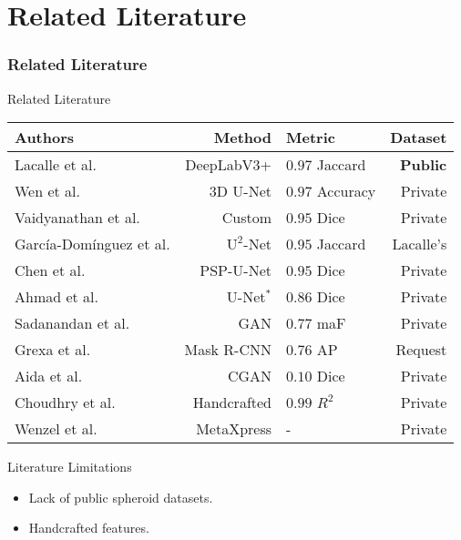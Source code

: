 \section{Related Literature}


\begin{frame}{}
    \frametitle{Related Literature}
\end{frame}


\begin{frame}{Related Literature}
    \begin{table}
        \centering
        \setlength{\tabcolsep}{10pt}

        \begin{tabular}{lrlr}
            \textbf{Authors} & \textbf{Method} & \textbf{Metric} & \textbf{Dataset} \\
            \toprule
            Lacalle et al. & DeepLabV3+ & $0.97$ Jaccard & \textbf{Public} \\
            Wen et al. & 3D U-Net & $0.97$ Accuracy & Private \\
            Vaidyanathan et al. & Custom & $0.95$ Dice & Private \\
            García-Domínguez et al. & $\mathrm{U}^2$-Net & $0.95$ Jaccard & Lacalle's \\
            Chen et al. & PSP-U-Net & $0.95$ Dice & Private \\
            Ahmad et al. & U-Net$^*$ & $0.86$ Dice & Private \\
            Sadanandan et al. & GAN & $0.77$ maF & Private \\
            Grexa et al. & Mask R-CNN & $0.76$ AP & Request \\
            Aida et al. & CGAN & $0.10$ Dice & Private \\
            \midrule
            Choudhry et al. & Handcrafted & $0.99$ $R^2$ & Private \\
            Wenzel et al. & MetaXpress & - & Private \\
        \end{tabular}
    \end{table}
\end{frame}

\begin{frame}{Literature Limitations}
    \begin{itemize}
        \item Lack of public spheroid datasets.
        \item Handcrafted features.
    \end{itemize}
\end{frame}
